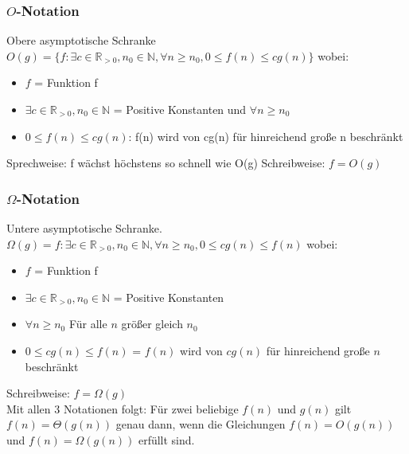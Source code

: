\documentclass[jou,apacite]{apa6}
\begin{document}
\subsubsection{$O$-Notation} 
Obere asymptotische Schranke\\
$O(g) = \{ f : \exists c \in \mathbb{R}_{>0},n_0 \in \mathbb{N}, \forall n \geq n_0,0 \leq f(n) \leq cg(n) \} $
wobei:
\begin{itemize}
    \item $f$ = Funktion f
    \item $\exists c \in \mathbb{R}_{>0},n_0 \in \mathbb{N}$ = Positive Konstanten und $\forall n \geq n_0$
    \item $0 \leq f(n) \leq cg(n)$: f(n) wird von cg(n) für hinreichend große n beschränkt
\end{itemize}
Sprechweise: f wächst höchstens so schnell wie O(g)
Schreibweise: $f = O(g)$
\\

\subsubsection{$\Omega$-Notation} 
Untere asymptotische Schranke.\\
$\Omega(g)={f: \exists c \in \mathbb{R}_{>0}, n_{0} \in \mathbb{N}, \forall n \geq n_{0},0 \leq cg(n) \leq f(n)}$ wobei:
\begin{itemize}
    \item $f$ = Funktion f
    \item $\exists c \in \mathbb{R}_{>0}, n_{0} \in \mathbb{N}$ = Positive Konstanten
    \item $\forall n \geq n_{0}$ Für alle $n$ größer gleich $n_{0}$
    \item $0 \leq cg(n) \leq f(n)$ = $f(n)$ wird von $cg(n)$ für hinreichend große $n$ beschränkt
\end{itemize}
Schreibweise: $f=\Omega(g)$ \\
Mit allen 3 Notationen folgt: Für zwei beliebige $f(n)$ und $g(n)$ gilt $f(n)=\Theta(g(n))$ genau dann, wenn die Gleichungen $f(n)=O(g(n))$ und $f(n) = \Omega(g(n))$ erfüllt sind.
\end{document}
